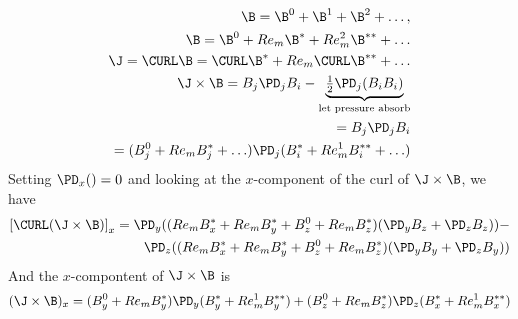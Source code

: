 \documentclass[11pt]{article}
\begin{document}
\begin{equation}\begin{aligned}
	\B = \B^0 + \B^1 + \B^2 + \hdots , \\
	\B = \B^0 + Re_m \B^* + Re_m^2 \B^{**} + \hdots \\
	\J = \CURL \B = \CURL \B^* + Re_m \CURL \B^{**} + \hdots \\
	\J \times \B = B_j \PD_j B_i - \underbrace{\tfrac{1}{2} \PD_j (B_i B_i)}_{\text{let pressure absorb}} \\
	= B_j \PD_j B_i \\
	= (B_j^0+Re_m B_j^* + \hdots) \PD_j (B_i^*+Re_m^1 B_i^{**} + \hdots) \\
\end{aligned} \end{equation}
Setting $\PD_x() = 0$ and looking at the $x$-component of the curl of $\J \times \B$, we have
\begin{equation}\begin{aligned}
	\left [\CURL (\J \times \B) \right]_x = 
	\PD_y ((Re_m B_x^* + Re_m B_y^* + B_z^0+Re_m B_z^*) (\PD_y B_z+\PD_z B_z)) - \\
	\PD_z ((Re_m B_x^* + Re_m B_y^* + B_z^0+Re_m B_z^*) (\PD_y B_y+\PD_z B_y))
\end{aligned} \end{equation}
And the $x$-compontent of $\J \times \B$ is 
\begin{equation}\begin{aligned}
	(\J \times \B)_x = 
	(B_y^0+Re_m B_y^*) \PD_y (B_y^*+Re_m^1 B_y^{**}) + (B_z^0+Re_m B_z^*) \PD_z (B_x^*+Re_m^1 B_x^{**}) \\
\end{aligned} \end{equation}
\end{document}
